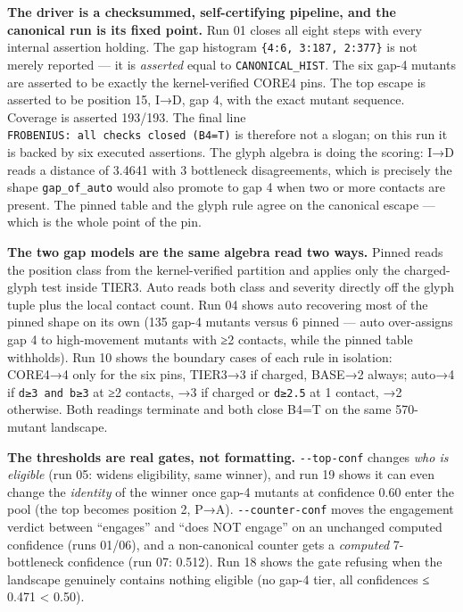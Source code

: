 \documentclass[12pt,a4paper]{article}
\begin{document}
\textbf{The driver is a checksummed, self-certifying pipeline, and the
canonical run is its fixed point.} Run 01 closes all eight steps with
every internal assertion holding. The gap histogram
\texttt{\{4:6,\ 3:187,\ 2:377\}} is not merely reported --- it is
\emph{asserted} equal to \texttt{CANONICAL\_HIST}. The six gap-4 mutants
are asserted to be exactly the kernel-verified CORE4 pins. The top
escape is asserted to be position 15, I→D, gap 4, with the exact mutant
sequence. Coverage is asserted 193/193. The final line
\texttt{FROBENIUS:\ all\ checks\ closed\ (B4=T)} is therefore not a
slogan; on this run it is backed by six executed assertions. The glyph
algebra is doing the scoring: I→D reads a distance of 3.4641 with 3
bottleneck disagreements, which is precisely the shape
\texttt{gap\_of\_auto} would also promote to gap 4 when two or more
contacts are present. The pinned table and the glyph rule agree on the
canonical escape --- which is the whole point of the pin.

\textbf{The two gap models are the same algebra read two ways.} Pinned
reads the position class from the kernel-verified partition and applies
only the charged-glyph test inside TIER3. Auto reads both class and
severity directly off the glyph tuple plus the local contact count. Run
04 shows auto recovering most of the pinned shape on its own (135 gap-4
mutants versus 6 pinned --- auto over-assigns gap 4 to high-movement
mutants with ≥2 contacts, while the pinned table withholds). Run 10
shows the boundary cases of each rule in isolation: CORE4→4 only for the
six pins, TIER3→3 if charged, BASE→2 always; auto→4 if
\texttt{d≥3\ and\ b≥3} at ≥2 contacts, →3 if charged or \texttt{d≥2.5}
at 1 contact, →2 otherwise. Both readings terminate and both close B4=T
on the same 570-mutant landscape.

\textbf{The thresholds are real gates, not formatting.}
\texttt{-\/-top-conf} changes \emph{who is eligible} (run 05: widens
eligibility, same winner), and run 19 shows it can even change the
\emph{identity} of the winner once gap-4 mutants at confidence 0.60
enter the pool (the top becomes position 2, P→A).
\texttt{-\/-counter-conf} moves the engagement verdict between
``engages'' and ``does NOT engage'' on an unchanged computed confidence
(runs 01/06), and a non-canonical counter gets a \emph{computed}
7-bottleneck confidence (run 07: 0.512). Run 18 shows the gate refusing
when the landscape genuinely contains nothing eligible (no gap-4 tier,
all confidences ≤ 0.471 \textless{} 0.50).
\end{document}
